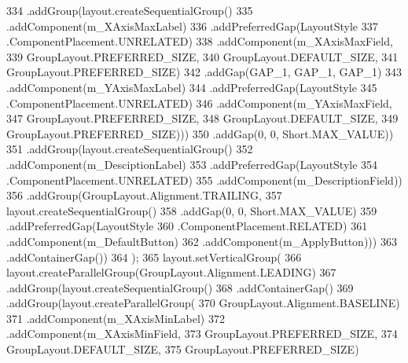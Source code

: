\begin{DoxyCode}
334                             .addGroup(layout.createSequentialGroup()
335                                 .addComponent(m\_XAxisMaxLabel)
336                                 .addPreferredGap(LayoutStyle
337                                         .ComponentPlacement.UNRELATED)
338                                 .addComponent(m\_XAxisMaxField, 
339                                         GroupLayout.PREFERRED\_SIZE, 
340                                         GroupLayout.DEFAULT\_SIZE, 
341                                         GroupLayout.PREFERRED\_SIZE)
342                                 .addGap(GAP\_1, GAP\_1, GAP\_1)
343                                 .addComponent(m\_YAxisMaxLabel)
344                                 .addPreferredGap(LayoutStyle
345                                         .ComponentPlacement.UNRELATED)
346                                 .addComponent(m\_YAxisMaxField, 
347                                         GroupLayout.PREFERRED\_SIZE,
348                                         GroupLayout.DEFAULT\_SIZE, 
349                                         GroupLayout.PREFERRED\_SIZE)))
350                         .addGap(0, 0, Short.MAX\_VALUE))
351                     .addGroup(layout.createSequentialGroup()
352                         .addComponent(m\_DesciptionLabel)
353                         .addPreferredGap(LayoutStyle
354                                 .ComponentPlacement.UNRELATED)
355                         .addComponent(m\_DescriptionField))
356                     .addGroup(GroupLayout.Alignment.TRAILING, 
357                               layout.createSequentialGroup()
358                         .addGap(0, 0, Short.MAX\_VALUE)
359                         .addPreferredGap(LayoutStyle
360                                 .ComponentPlacement.RELATED)
361                         .addComponent(m\_DefaultButton)
362                         .addComponent(m\_ApplyButton)))
363                 .addContainerGap())
364         );
365         layout.setVerticalGroup(
366             layout.createParallelGroup(GroupLayout.Alignment.LEADING)
367             .addGroup(layout.createSequentialGroup()
368                 .addContainerGap()
369                 .addGroup(layout.createParallelGroup(
370                         GroupLayout.Alignment.BASELINE)
371                     .addComponent(m\_XAxisMinLabel)
372                     .addComponent(m\_XAxisMinField, 
373                             GroupLayout.PREFERRED\_SIZE, 
374                             GroupLayout.DEFAULT\_SIZE, 
375                             GroupLayout.PREFERRED\_SIZE)

\end{DoxyCode}
